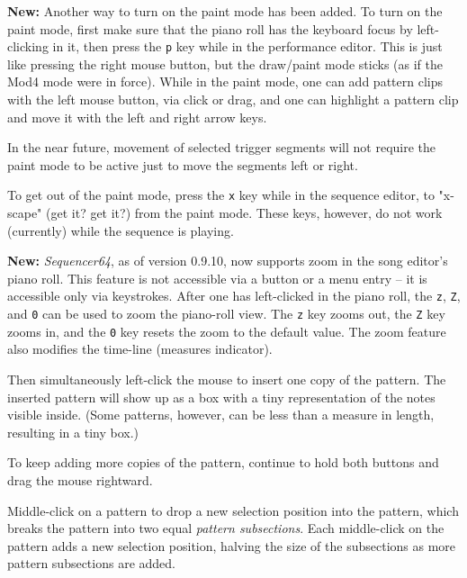    \textbf{New:}
   Another way to turn on the paint mode has been added.
   To turn on the paint mode, first make sure that the piano roll has the
   keyboard focus by left-clicking in it, then press the
   \texttt{p} key while in the performance editor.
   This is just like pressing the right mouse button, but the draw/paint mode
   sticks (as if the Mod4 mode were in force).
   While in the paint mode, one can add pattern clips with the left mouse
   button, via click or drag, and one can highlight a pattern clip and move it
   with the left and right arrow keys.

   In the near future, movement of selected trigger segments will not
   require the paint mode to be active just to move the segments left or
   right.

   To get out of the paint mode, press the
   \texttt{x} key while in the sequence editor, to "x-scape" (get it?  get it?)
   from the paint mode.
   These keys, however, do not work (currently) while the sequence is playing.

   \textbf{New:}
   \textsl{Sequencer64}, as of version 0.9.10, now supports zoom in the song
   editor's piano roll.  This feature is not accessible via a button or a menu
   entry -- it is accessible only via keystrokes.
   After one has left-clicked in the piano roll, the \texttt{z}, \texttt{Z},
   and \texttt{0} can be used to zoom the piano-roll view.  The \texttt{z} key
   zooms out, the \texttt{Z} key zooms in, and the \texttt{0} key resets the
   zoom to the default value.  The zoom feature also modifies the time-line
   (measures indicator).

   Then simultaneously left-click the mouse to insert one copy of the
   pattern.  The inserted pattern will show up as a box with a tiny
   representation of the notes visible inside.  (Some patterns, however, can
   be less than a measure in length, resulting in a tiny box.)

   To keep adding more copies of the pattern, continue to hold both buttons
   and drag the mouse rightward.

   Middle-click on a pattern to drop a new selection position into the
   pattern,
   which breaks the pattern into two equal \textsl{pattern subsections}.
   Each middle-click on the pattern adds a new selection position,
   halving the size of the subsections as more pattern subsections are
   added.

